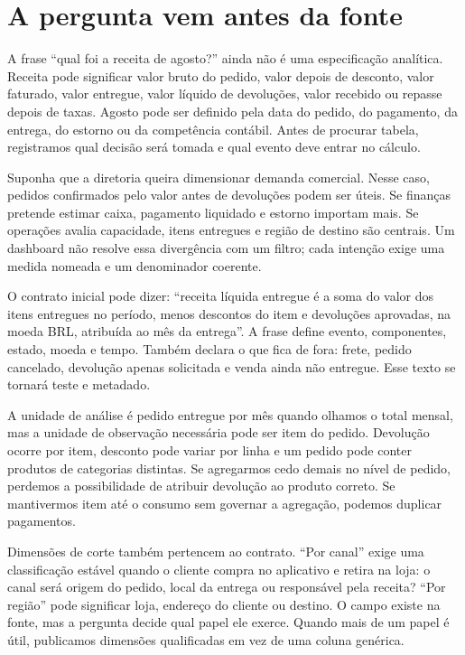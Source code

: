 \section{A pergunta vem antes da fonte}

A frase ``qual foi a receita de agosto?'' ainda não é uma especificação analítica. Receita pode significar valor bruto do pedido, valor depois de desconto, valor faturado, valor entregue, valor líquido de devoluções, valor recebido ou repasse depois de taxas. Agosto pode ser definido pela data do pedido, do pagamento, da entrega, do estorno ou da competência contábil. Antes de procurar tabela, registramos qual decisão será tomada e qual evento deve entrar no cálculo.

Suponha que a diretoria queira dimensionar demanda comercial. Nesse caso, pedidos confirmados pelo valor antes de devoluções podem ser úteis. Se finanças pretende estimar caixa, pagamento liquidado e estorno importam mais. Se operações avalia capacidade, itens entregues e região de destino são centrais. Um dashboard não resolve essa divergência com um filtro; cada intenção exige uma medida nomeada e um denominador coerente.

O contrato inicial pode dizer: ``receita líquida entregue é a soma do valor dos itens entregues no período, menos descontos do item e devoluções aprovadas, na moeda BRL, atribuída ao mês da entrega''. A frase define evento, componentes, estado, moeda e tempo. Também declara o que fica de fora: frete, pedido cancelado, devolução apenas solicitada e venda ainda não entregue. Esse texto se tornará teste e metadado.

A unidade de análise é pedido entregue por mês quando olhamos o total mensal, mas a unidade de observação necessária pode ser item do pedido. Devolução ocorre por item, desconto pode variar por linha e um pedido pode conter produtos de categorias distintas. Se agregarmos cedo demais no nível de pedido, perdemos a possibilidade de atribuir devolução ao produto correto. Se mantivermos item até o consumo sem governar a agregação, podemos duplicar pagamentos.

Dimensões de corte também pertencem ao contrato. ``Por canal'' exige uma classificação estável quando o cliente compra no aplicativo e retira na loja: o canal será origem do pedido, local da entrega ou responsável pela receita? ``Por região'' pode significar loja, endereço do cliente ou destino. O campo existe na fonte, mas a pergunta decide qual papel ele exerce. Quando mais de um papel é útil, publicamos dimensões qualificadas em vez de uma coluna genérica.

